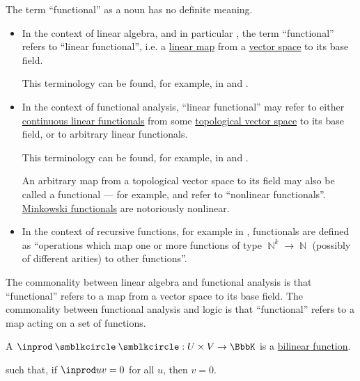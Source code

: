 \begin{remark}\label{rem:functional}
  The term \enquote{functional} as a noun has no definite meaning.

  \begin{itemize}
    \item In the context of linear algebra, and in particular , the term \enquote{functional} refers to \enquote{linear functional}, i.e. a \hyperref[def:semimodule/homomorphism]{linear map} from a \hyperref[def:vector_space]{vector space} to its base field.

    This terminology can be found, for example, in \cite[50]{Knapp2016BasicAlgebra} and \cite[sec. 26.1]{Тыртышников2004Лекции}.

    \item In the context of functional analysis, \enquote{linear functional} may refer to either \hyperref[def:continuous_dual_space]{continuous linear functionals} from some \hyperref[def:topological_vector_space]{topological vector space} to its base field, or to arbitrary linear functionals.

    This terminology can be found, for example, in \cite[def. 3.1]{Rudin1991Functional} and \cite[sec. 1.3]{Clarke2013}.

    An arbitrary map from a topological vector space to its field may also be called a functional --- for example, \cite[102]{KufnerFucik1980} and \cite[223]{Deimling1985} refer to \enquote{nonlinear functionals}. \hyperref[def:minkowski_functional]{Minkowski functionals} are notoriously nonlinear.

    \item In the context of recursive functions, for example in \cite{StanfordPlato:recursive_functions}, functionals are defined as \enquote{operations which map one or more functions of type \( \BbbN^k \to \BbbN \) (possibly of different arities) to other functions}.
  \end{itemize}

  The commonality between linear algebra and functional analysis is that \enquote{functional} refers to a map from a vector space to its base field. The commonality between functional analysis and logic is that \enquote{functional} refers to a map acting on a set of functions.
\end{remark}

\begin{definition}\label{def:duality_pairing}\mimprovised
  A  \( \inprod \anon \anon: U \times V \to \BbbK \) is a \hyperref[def:multilinear_function]{bilinear function}.

   such that, if \( \inprod u v = 0 \) for all \( u \), then \( v = 0 \).
\end{definition}

